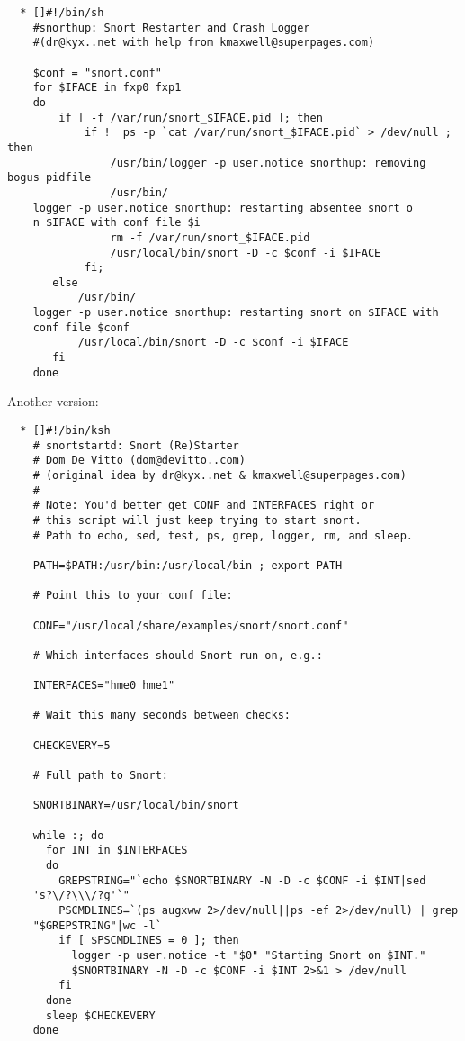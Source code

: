 \documentclass{article}
\begin{document}
\begin{verbatim}
  * []#!/bin/sh
    #snorthup: Snort Restarter and Crash Logger 
    #(dr@kyx..net with help from kmaxwell@superpages.com)  

    $conf = "snort.conf"
    for $IFACE in fxp0 fxp1
    do
        if [ -f /var/run/snort_$IFACE.pid ]; then
            if !  ps -p `cat /var/run/snort_$IFACE.pid` > /dev/null ; then
                /usr/bin/logger -p user.notice snorthup: removing bogus pidfile
                /usr/bin/
    logger -p user.notice snorthup: restarting absentee snort o
    n $IFACE with conf file $i
                rm -f /var/run/snort_$IFACE.pid
                /usr/local/bin/snort -D -c $conf -i $IFACE
            fi;
       else
           /usr/bin/
    logger -p user.notice snorthup: restarting snort on $IFACE with 
    conf file $conf
           /usr/local/bin/snort -D -c $conf -i $IFACE 
       fi 
    done
\end{verbatim}
Another version:
\begin{verbatim}
  * []#!/bin/ksh
    # snortstartd: Snort (Re)Starter
    # Dom De Vitto (dom@devitto..com)
    # (original idea by dr@kyx..net & kmaxwell@superpages.com)
    #
    # Note: You'd better get CONF and INTERFACES right or
    # this script will just keep trying to start snort.
    # Path to echo, sed, test, ps, grep, logger, rm, and sleep.

    PATH=$PATH:/usr/bin:/usr/local/bin ; export PATH
    
    # Point this to your conf file:
    
    CONF="/usr/local/share/examples/snort/snort.conf"

    # Which interfaces should Snort run on, e.g.:

    INTERFACES="hme0 hme1"

    # Wait this many seconds between checks:

    CHECKEVERY=5

    # Full path to Snort:

    SNORTBINARY=/usr/local/bin/snort

    while :; do
      for INT in $INTERFACES
      do
        GREPSTRING="`echo $SNORTBINARY -N -D -c $CONF -i $INT|sed
    's?\/?\\\/?g'`"
        PSCMDLINES=`(ps augxww 2>/dev/null||ps -ef 2>/dev/null) | grep
    "$GREPSTRING"|wc -l`
        if [ $PSCMDLINES = 0 ]; then
          logger -p user.notice -t "$0" "Starting Snort on $INT."
          $SNORTBINARY -N -D -c $CONF -i $INT 2>&1 > /dev/null
        fi
      done
      sleep $CHECKEVERY
    done
\end{verbatim}
\end{document}
